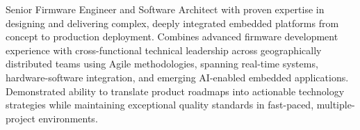%
%
%

\vspace*{-3mm}\par{
Senior Firmware Engineer and Software Architect with proven expertise in designing and delivering complex, deeply integrated embedded platforms from concept to production deployment. Combines advanced firmware development experience with cross-functional technical leadership across geographically distributed teams using Agile methodologies, spanning real-time systems, hardware-software integration, and emerging AI-enabled embedded applications. Demonstrated ability to translate product roadmaps into actionable technology strategies while maintaining exceptional quality standards in fast-paced, multiple-project environments.
}

